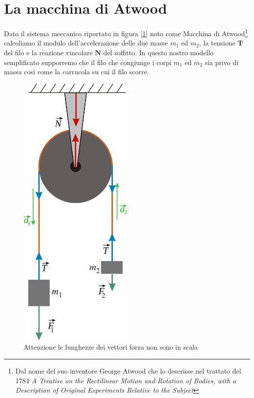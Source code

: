 \documentclass[a4paper,10pt,oneside]{article}
\begin{document}
\thispagestyle{empty}

\section*{La macchina di Atwood}


Dato il sistema meccanico riportato in figura [\ref{fig:atwood}] noto come Macchina di Atwood\footnote{Dal nome del suo inventore George Atwood che lo descrisse nel trattato del 1784 \emph{A Treatise on the Rectilinear Motion and Rotation of Bodies, with a Description of Original Experiments Relative to the Subject}}  calcoliamo il modulo dell'accelerazione delle due masse $m_1$ ed $m_2$, la tensione $\mathbf{T}$ del filo e la reazione vincolare $\mathbf{N}$ del soffitto. In questo nostro modello semplificato supporremo che il filo che congiunge i corpi $m_1$ ed $m_2$ sia privo di massa così come la carrucola su cui il filo scorre.
\begin{figure}[H]
 \centering
 \includegraphics[width=0.5\textwidth]{immagini/atwood_1.png}
 \caption{Attenzione le lunghezze dei vettori forza non sono in scala}
 \label{fig:atwood}
\end{figure}
\end{document}
